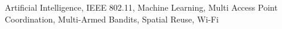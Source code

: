 \documentclass[conference,a4paper]{IEEEtran}
\begin{document}
\begin{IEEEkeywords}
Artificial Intelligence, IEEE 802.11, Machine Learning, Multi Access Point Coordination, Multi-Armed Bandits, Spatial Reuse, Wi-Fi
\end{IEEEkeywords}













\end{document}
